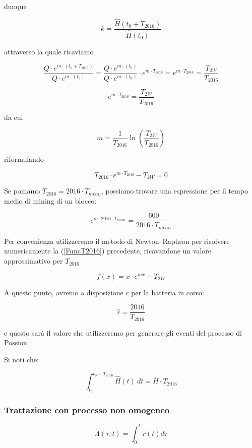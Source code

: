 \documentclass{book}
\theoremstyle{definition}
\begin{document}
dunque

$$
    k = \frac{\hat{H}(t_{0} + T_{2016})}{\hat{H}(t_{0})}
$$

attraverso la quale ricaviamo

$$
\frac{Q \cdot e^{m \cdot (t_{0} + T_{2016})}}{Q \cdot e^{m \cdot (t_{0})}} = \frac{ Q \cdot e^{m \cdot (t_{0})} }{ Q \cdot e^{m \cdot (t_{0})} } \cdot e^{m \cdot T_{2016}} = e^{m \cdot T_{2016}} = \frac{T_{2W}}{T_{2016}} 
$$

$$
    e^{m \cdot T_{2016}} = \frac{T_{2W}}{T_{2016}}
$$

da cui

$$
m = \frac{1}{T_{2016}} \ln(\frac{T_{2W}}{T_{2016}})
$$

riformulando

\begin{equation}
    T_{2016} \cdot e^{m \cdot T_{2016}} - T_{2W} = 0 \label{FuncT2016}
\end{equation}

Se poniamo $T_{2016} = 2016 \cdot T_{mean}$, possiamo trovare una espressione per il tempo medio di mining di un blocco:

$$
    e^{m \cdot 2016 \cdot T_{mean}} = \frac{600}{2016 \cdot T_{mean}}
$$

Per convenienza utilizzeremo il metodo di Newton–Raphson per risolvere numericamente la (\ref{FuncT2016}) precedente, ricavandone un valore approssimativo per $T_{2016}$

\begin{equation}
    f(x) = x \cdot e^{mx} - T_{2W}
\end{equation}

A questo punto, avremo a disposizione $r$ per la batteria in corso:

$$
    \hat{r} = \frac{2016}{T_{2016}}
$$

e questo sarà il valore che utilizzeremo per generare gli eventi del processo di Possion.

Si noti che:

\begin{equation}
    \int_{t_{0}}^{ t_{0} + T_{2016} } \hat{H}(t) \ dt = \bar{H} \cdot T_{2016}
\end{equation}

\subsubsection{Trattazione con processo non omogeneo}

\begin{equation}
    \tilde{\Lambda}(\tau, t) = \int_{0}^{t} r(t) d\tau
\end{equation}
\end{document}
